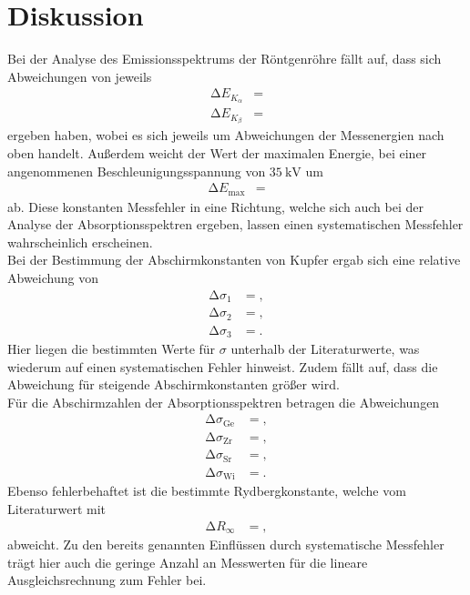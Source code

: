 \section{Diskussion}
\label{sec:Diskussion}
Bei der Analyse des Emissionsspektrums der Röntgenröhre fällt auf, dass sich Abweichungen von jeweils
\begin{align*}
  \increment E_{K_\alpha} &=  \\
  \increment E_{K_\beta} &= 
\end{align*}
ergeben haben, wobei es sich jeweils um Abweichungen der Messenergien nach oben handelt.
Außerdem weicht der Wert der maximalen Energie, bei einer angenommenen Beschleunigungsspannung von $\SI{35}{\kilo\volt}$ um
\begin{align*}
  \increment E_{\text{max}} &= 
\end{align*}
ab.
Diese konstanten Messfehler in eine Richtung, welche sich auch bei der Analyse der Absorptionsspektren ergeben, lassen einen systematischen Messfehler wahrscheinlich erscheinen.\\
Bei der Bestimmung der Abschirmkonstanten von Kupfer ergab sich eine relative Abweichung von
\begin{align*}
  \increment \sigma_{1} &= , \\
  \increment \sigma_{2} &= , \\
  \increment \sigma_{3} &= .
\end{align*}
Hier liegen die bestimmten Werte für $\sigma$ unterhalb der Literaturwerte, was wiederum auf einen systematischen Fehler hinweist.
Zudem fällt auf, dass die Abweichung für steigende Abschirmkonstanten größer wird.\\
Für die Abschirmzahlen der Absorptionsspektren betragen die Abweichungen
\begin{align*}
  \increment \sigma_{\text{Ge}} &= , \\
  \increment \sigma_{\text{Zr}} &= , \\
  \increment \sigma_{\text{Sr}} &= , \\
  \increment \sigma_{\text{Wi}} &= .
\end{align*}
Ebenso fehlerbehaftet ist die bestimmte Rydbergkonstante, welche vom Literaturwert \cite{Konstanten} mit
\begin{align*}
  \increment R_\infty &= ,
\end{align*}
abweicht.
Zu den bereits genannten Einflüssen durch systematische Messfehler trägt hier auch die geringe Anzahl an Messwerten für die lineare Ausgleichsrechnung zum Fehler bei.
